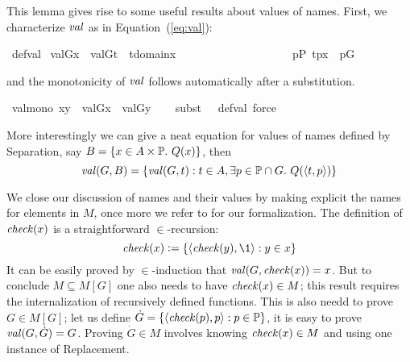 This lemma gives rise to some useful results about values of
names. First, we characterize $\operatorname{\mathit{val}}$ as in Equation~(\ref{eq:val}):
\begin{isabelle}
  \isamarkupfalse%
  \ def{\isacharunderscore}val{\isacharcolon}\isanewline
  \ {\isachardoublequoteopen}val{\isacharparenleft}G{\isacharcomma}x{\isacharparenright}\ {\isacharequal}\ {\isacharbraceleft}val{\isacharparenleft}G{\isacharcomma}t{\isacharparenright}\ {\isachardot}{\isachardot}\ t{\isasymin}domain{\isacharparenleft}x{\isacharparenright}\ {\isacharcomma}\isanewline
\ \ \ \ \ \ \ \ \ \ \ \ \ \ \ \ \ \ \ {\isasymexists}p{\isasymin}P{\isachardot}\ {\isacharless}t{\isacharcomma}p{\isachargreater}{\isasymin}x\ {\isasymand}\ p{\isasymin}G\ {\isacharbraceright}{\isachardoublequoteclose}
\end{isabelle}
and the monotonicity of $\operatorname{\mathit{val}}$ follows automatically after a
substitution.
\begin{isabelle}
\isamarkupfalse%
\ val{\isacharunderscore}mono{\isacharcolon}\ {\isachardoublequoteopen}x{\isasymsubseteq}y\ {\isasymLongrightarrow}\ val{\isacharparenleft}G{\isacharcomma}x{\isacharparenright}\ {\isasymsubseteq}\ val{\isacharparenleft}G{\isacharcomma}y{\isacharparenright}{\isachardoublequoteclose}\isanewline
%
\ \ \isamarkupfalse%
\ {\isacharparenleft}subst\ {\isacharparenleft}{}\ {}{\isacharparenright}\ def{\isacharunderscore}val{\isacharcomma}\ force{\isacharparenright}%
\end{isabelle}
More interestingly we can give a neat equation for values of
names defined by Separation, say $B = \{x\in A\times \mathbb{P}.\ Q(x)\}$,
then
\begin{equation}
\val(G,B) = \{\val(G,t) : t\in A , \exists p\in \PP \cap G.\ Q(\lb t,p\rb) \} \label{eq:val-name-sep}
\end{equation}

We close our discussion of names and their values by making explicit
the names for elements in $M$, once more we refer to
\cite{2018arXiv180705174G} for our formalization. The definition of
$\operatorname{\mathit{check}}(x)$ is a straightforward $\in$-recursion:
\begin{equation*}
  \label{eq:def-check}
  \chk(x)\defi\{\lb\chk(y),\1\rb : y\in x\}
\end{equation*}
It can be easily proved by $\in$-induction that $\operatorname{\mathit{val}}(G,\operatorname{\mathit{check}}(x))=x$.
But to conclude $M\subseteq M[G]$ one also needs to have
$\operatorname{\mathit{check}}(x) \in M$; this result requires the internalization of
recursively defined functions. This is also needd to prove
$G \in M[G]$; let us define
$\dot G= \{\langle \operatorname{\mathit{check}}(p),p\rangle : p \in \mathbb{P} \}$, it is easy to prove
$\operatorname{\mathit{val}}(G,\dot G) = G$. Proving $\dot G\in M$ involves
knowing $\operatorname{\mathit{check}}(x) \in M$ and using one instance of Replacement.

